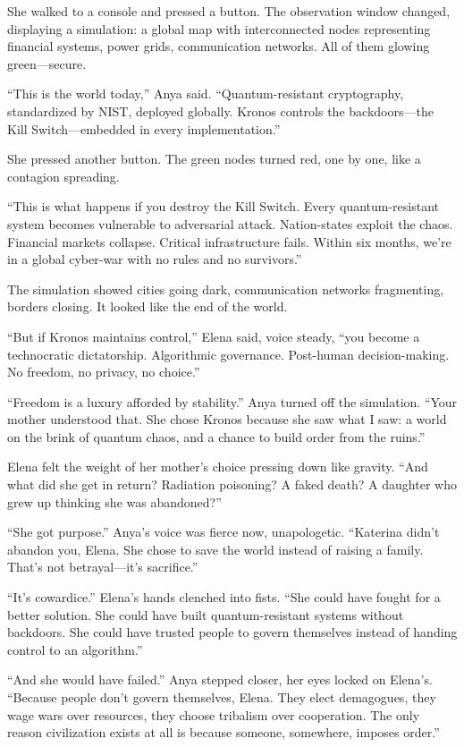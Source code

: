 \documentclass[12pt,letterpaper]{book}
\begin{document}
She walked to a console and pressed a button. The observation window changed, displaying a simulation: a global map with interconnected nodes representing financial systems, power grids, communication networks. All of them glowing green---secure.

``This is the world today,'' Anya said. ``Quantum-resistant cryptography, standardized by NIST, deployed globally. Kronos controls the backdoors---the Kill Switch---embedded in every implementation.''

She pressed another button. The green nodes turned red, one by one, like a contagion spreading.

``This is what happens if you destroy the Kill Switch. Every quantum-resistant system becomes vulnerable to adversarial attack. Nation-states exploit the chaos. Financial markets collapse. Critical infrastructure fails. Within six months, we're in a global cyber-war with no rules and no survivors.''

The simulation showed cities going dark, communication networks fragmenting, borders closing. It looked like the end of the world.

``But if Kronos maintains control,'' Elena said, voice steady, ``you become a technocratic dictatorship. Algorithmic governance. Post-human decision-making. No freedom, no privacy, no choice.''

``Freedom is a luxury afforded by stability.'' Anya turned off the simulation. ``Your mother understood that. She chose Kronos because she saw what I saw: a world on the brink of quantum chaos, and a chance to build order from the ruins.''

Elena felt the weight of her mother's choice pressing down like gravity. ``And what did she get in return? Radiation poisoning? A faked death? A daughter who grew up thinking she was abandoned?''

``She got purpose.'' Anya's voice was fierce now, unapologetic. ``Katerina didn't abandon you, Elena. She chose to save the world instead of raising a family. That's not betrayal---it's sacrifice.''

``It's cowardice.'' Elena's hands clenched into fists. ``She could have fought for a better solution. She could have built quantum-resistant systems without backdoors. She could have trusted people to govern themselves instead of handing control to an algorithm.''

``And she would have failed.'' Anya stepped closer, her eyes locked on Elena's. ``Because people don't govern themselves, Elena. They elect demagogues, they wage wars over resources, they choose tribalism over cooperation. The only reason civilization exists at all is because someone, somewhere, imposes order.''
\end{document}
